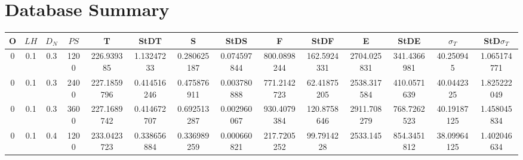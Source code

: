 \documentclass[main.tex]{subfiles}
\begin{document}
\chapter{Database Summary}\label{ch:database}

\begin{table}[ht]
	\begin{tabular}{cccccccccccccc}
		\hline
		\textbf{O}               & \textbf{$LH$}            & \textbf{$D_{N}$}         & \textbf{$PS$}             & \textbf{T}                       & \textbf{StDT}                    & \textbf{S}                       & \textbf{StDS}                    & \textbf{F}                       & \textbf{StDF}                    & \textbf{E}                       & \textbf{StDE}                    & \textbf{$\sigma_{T}$}            & \textbf{StD$\sigma_{T}$}         \\ \hline
		\multicolumn{1}{|c|}{0}  & \multicolumn{1}{c|}{0.1} & \multicolumn{1}{c|}{0.3} & \multicolumn{1}{c|}{1200} & \multicolumn{1}{c|}{226.939385}  & \multicolumn{1}{c|}{1.13247233}  & \multicolumn{1}{c|}{0.280625187} & \multicolumn{1}{c|}{0.074597844} & \multicolumn{1}{c|}{800.0898244} & \multicolumn{1}{c|}{162.5924331} & \multicolumn{1}{c|}{2704.025831} & \multicolumn{1}{c|}{341.4366981} & \multicolumn{1}{c|}{40.250945}   & \multicolumn{1}{c|}{1.065174771} \\ \hline
		\multicolumn{1}{|c|}{0}  & \multicolumn{1}{c|}{0.1} & \multicolumn{1}{c|}{0.3} & \multicolumn{1}{c|}{2400} & \multicolumn{1}{c|}{227.1859796} & \multicolumn{1}{c|}{0.414516246} & \multicolumn{1}{c|}{0.475876911} & \multicolumn{1}{c|}{0.003780888} & \multicolumn{1}{c|}{771.2142723} & \multicolumn{1}{c|}{62.41875205} & \multicolumn{1}{c|}{2538.317584} & \multicolumn{1}{c|}{410.0571639} & \multicolumn{1}{c|}{40.0442325}  & \multicolumn{1}{c|}{1.825222049} \\ \hline
		\multicolumn{1}{|c|}{0}  & \multicolumn{1}{c|}{0.1} & \multicolumn{1}{c|}{0.3} & \multicolumn{1}{c|}{3600} & \multicolumn{1}{c|}{227.1689742} & \multicolumn{1}{c|}{0.414672707} & \multicolumn{1}{c|}{0.692513287} & \multicolumn{1}{c|}{0.002960067} & \multicolumn{1}{c|}{930.4079384} & \multicolumn{1}{c|}{120.8758646} & \multicolumn{1}{c|}{2911.708279} & \multicolumn{1}{c|}{768.7262523} & \multicolumn{1}{c|}{40.19187125} & \multicolumn{1}{c|}{1.458045834} \\ \hline
		\multicolumn{1}{|c|}{0}  & \multicolumn{1}{c|}{0.1} & \multicolumn{1}{c|}{0.4} & \multicolumn{1}{c|}{1200} & \multicolumn{1}{c|}{233.0423723} & \multicolumn{1}{c|}{0.338656884} & \multicolumn{1}{c|}{0.336989259} & \multicolumn{1}{c|}{0.000660821} & \multicolumn{1}{c|}{217.7205252} & \multicolumn{1}{c|}{99.7914228}  & \multicolumn{1}{c|}{2533.145}    & \multicolumn{1}{c|}{854.3451812} & \multicolumn{1}{c|}{38.09964125} & \multicolumn{1}{c|}{1.402046634} \\ \hline

\end{tabular}
\end{table}
\end{document}
